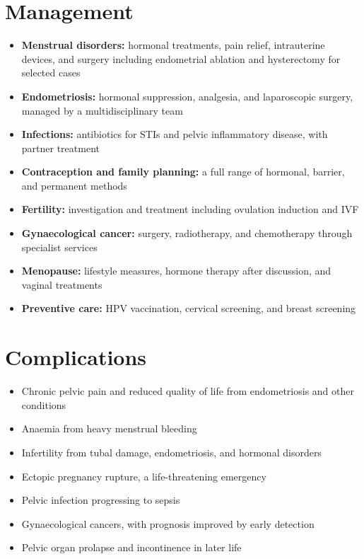 \section*{Management}
\begin{itemize}
    \item \textbf{Menstrual disorders:} hormonal treatments, pain relief, intrauterine devices, and surgery including endometrial ablation and hysterectomy for selected cases
    \item \textbf{Endometriosis:} hormonal suppression, analgesia, and laparoscopic surgery, managed by a multidisciplinary team
    \item \textbf{Infections:} antibiotics for STIs and pelvic inflammatory disease, with partner treatment
    \item \textbf{Contraception and family planning:} a full range of hormonal, barrier, and permanent methods
    \item \textbf{Fertility:} investigation and treatment including ovulation induction and IVF
    \item \textbf{Gynaecological cancer:} surgery, radiotherapy, and chemotherapy through specialist services
    \item \textbf{Menopause:} lifestyle measures, hormone therapy after discussion, and vaginal treatments
    \item \textbf{Preventive care:} HPV vaccination, cervical screening, and breast screening
\end{itemize}

\section*{Complications}
\begin{itemize}
    \item Chronic pelvic pain and reduced quality of life from endometriosis and other conditions
    \item Anaemia from heavy menstrual bleeding
    \item Infertility from tubal damage, endometriosis, and hormonal disorders
    \item Ectopic pregnancy rupture, a life-threatening emergency
    \item Pelvic infection progressing to sepsis
    \item Gynaecological cancers, with prognosis improved by early detection
    \item Pelvic organ prolapse and incontinence in later life
\end{itemize}

